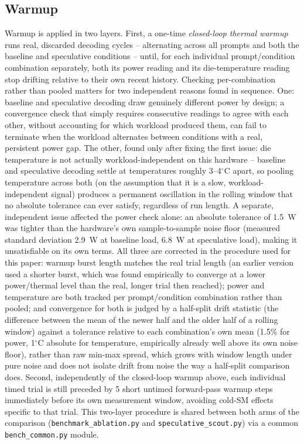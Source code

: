 \documentclass[conference]{IEEEtran}
\begin{document}
\subsection{Warmup}
\label{sec:warmup-correction}

Warmup is applied in two layers. First, a one-time \emph{closed-loop thermal
warmup} runs real, discarded decoding cycles -- alternating across all
prompts and both the baseline and speculative conditions -- until, for each
individual prompt/condition combination separately, both its power reading
and its die-temperature reading stop drifting relative to their own recent
history. Checking per-combination rather than pooled matters for two
independent reasons found in sequence. One: baseline and speculative
decoding draw genuinely different power by design; a convergence check that
simply requires consecutive readings to agree with each other, without
accounting for which workload produced them, can fail to terminate when the
workload alternates between conditions with a real, persistent power gap.
The other, found only after fixing the first issue: die temperature is not
actually workload-independent on this hardware -- baseline and speculative
decoding settle at temperatures roughly 3--4$^\circ$C apart, so pooling
temperature across both (on the assumption that it is a slow,
workload-independent signal) produces a permanent oscillation in the
rolling window that no absolute tolerance can ever satisfy, regardless of
run length. A separate, independent issue affected the power check alone:
an absolute tolerance of 1.5~W was tighter than the hardware's own
sample-to-sample noise floor (measured standard deviation 2.9~W at
baseline load, 6.8~W at speculative load), making it unsatisfiable on its
own terms. All three are corrected in the procedure used for this paper:
warmup burst length matches the real trial length (an earlier version used
a shorter burst, which was found empirically to converge at a lower
power/thermal level than the real, longer trial then reached); power and
temperature are both tracked per prompt/condition combination rather than
pooled; and convergence for both is judged by a half-split drift statistic
(the difference between the mean of the newer half and the older half of a
rolling window) against a tolerance relative to each combination's own mean
(1.5\% for power, 1$^\circ$C absolute for temperature, empirically already
well above its own noise floor), rather than raw min-max spread, which
grows with window length under pure noise and does not isolate drift from
noise the way a half-split comparison does. Second, independently of the
closed-loop warmup above, each individual timed trial is still preceded by 5
short untimed forward-pass warmup steps immediately before its own
measurement window, avoiding cold-SM effects specific to that trial. This
two-layer procedure is shared between both arms of the comparison
(\texttt{benchmark\_ablation.py} and \texttt{speculative\_scout.py}) via a
common \texttt{bench\_common.py} module.
\end{document}
